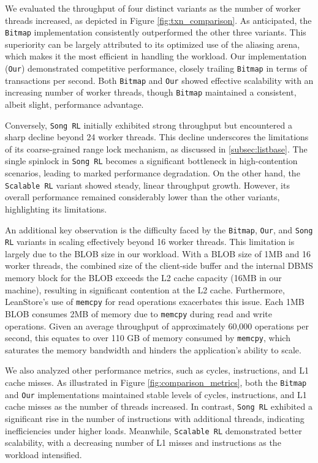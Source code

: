 We evaluated the throughput of four distinct variants as the number of worker threads increased, as depicted in Figure \ref{fig:txn_comparison}. As anticipated, the \texttt{Bitmap} implementation consistently outperformed the other three variants. This superiority can be largely attributed to its optimized use of the aliasing arena, which makes it the most efficient in handling the workload. Our implementation (\texttt{Our}) demonstrated competitive performance, closely trailing \texttt{Bitmap} in terms of transactions per second. Both \texttt{Bitmap} and \texttt{Our} showed effective scalability with an increasing number of worker threads, though \texttt{Bitmap} maintained a consistent, albeit slight, performance advantage.

Conversely, \texttt{Song RL} initially exhibited strong throughput but encountered a sharp decline beyond 24 worker threads. This decline underscores the limitations of its coarse-grained range lock mechanism, as discussed in \ref{subsec:listbase}. The single spinlock in \texttt{Song RL} becomes a significant bottleneck in high-contention scenarios, leading to marked performance degradation. On the other hand, the \texttt{Scalable RL} variant showed steady, linear throughput growth. However, its overall performance remained considerably lower than the other variants, highlighting its limitations.

An additional key observation is the difficulty faced by the \texttt{Bitmap}, \texttt{Our}, and \texttt{Song RL} variants in scaling effectively beyond 16 worker threads. This limitation is largely due to the BLOB size in our workload. With a BLOB size of 1MB and 16 worker threads, the combined size of the client-side buffer and the internal DBMS memory block for the BLOB exceeds the L2 cache capacity (16MB in our machine), resulting in significant contention at the L2 cache. Furthermore, LeanStore's use of \texttt{memcpy} for read operations exacerbates this issue. Each 1MB BLOB consumes 2MB of memory due to \texttt{memcpy} during read and write operations. Given an average throughput of approximately 60,000 operations per second, this equates to over 110 GB of memory consumed by \texttt{memcpy}, which saturates the memory bandwidth and hinders the application's ability to scale.

We also analyzed other performance metrics, such as cycles, instructions, and L1 cache misses. As illustrated in Figure \ref{fig:comparison_metrics}, both the \texttt{Bitmap} and \texttt{Our} implementations maintained stable levels of cycles, instructions, and L1 cache misses as the number of threads increased. In contrast, \texttt{Song RL} exhibited a significant rise in the number of instructions with additional threads, indicating inefficiencies under higher loads. Meanwhile, \texttt{Scalable RL} demonstrated better scalability, with a decreasing number of L1 misses and instructions as the workload intensified.


